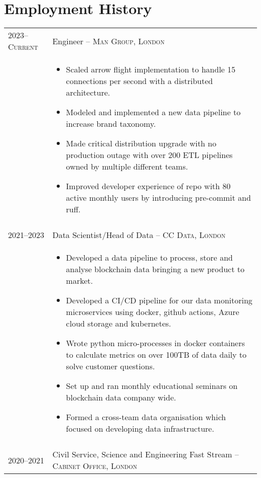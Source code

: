 \documentclass[a4paper,10pt]{article}
\begin{document}
\section{Employment History}
\begin{tabular}{p{2.25cm}|p{15cm}}
\textsc{2023--Current} & \large{Engineer -- \textsc{Man Group, London}}\\
	& \vspace{-0.27 in}\begin{itemize}
		\item Scaled arrow flight implementation to handle 15 connections per second with a distributed architecture.
		\item Modeled and implemented a new data pipeline to increase brand taxonomy.
		\item Made critical distribution upgrade with no production outage with over 200 ETL pipelines owned by multiple different teams.
		\item Improved developer experience of repo with 80 active monthly users by introducing pre-commit and ruff.
	\end{itemize}\vspace{-0.15 in}\\
\multicolumn{2}{c}{}\\
	\textsc{2021--2023} & \large{Data Scientist/Head of Data -- \textsc{CC Data, London}}\\
	 & \vspace{-0.07 in}\begin{itemize}
	 	\item Developed a data pipeline to process, store and analyse blockchain data bringing a new product to market.
		\item Developed a CI/CD pipeline for our data monitoring microservices using docker, github actions, Azure cloud storage and kubernetes.
		\item Wrote python micro-processes in docker containers to calculate metrics on over 100TB of data daily to solve customer questions.
		\item Set up and ran monthly educational seminars on blockchain data company wide.
		\item Formed a cross-team data organisation which focused on developing data infrastructure.
	\end{itemize}\vspace{-0.15 in}\\
\multicolumn{2}{c}{}\\
%
%
	\textsc{2020--2021} & \large{Civil Service, Science and Engineering Fast Stream -- \textsc{Cabinet Office, London}}\\

\end{tabular}
\end{document}
